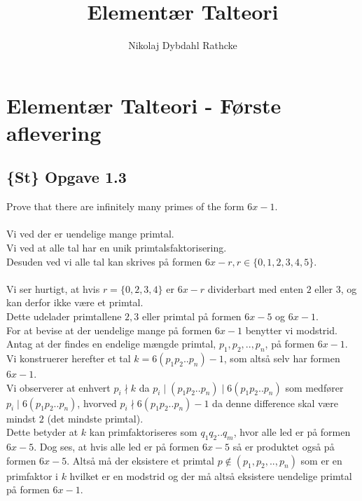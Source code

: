 \documentclass[12pt]{article}
\title{Elementær Talteori}
\author{Nikolaj Dybdahl Rathcke}
\begin{document}
\section*{Elementær Talteori - Første aflevering}

\subsection*{\{\textbf{St}\} Opgave 1.3}
Prove that there are infinitely many primes of the form $6x-1$.\\
\\
Vi ved der er uendelige mange primtal.\\
Vi ved at alle tal har en unik primtalsfaktorisering.\\
Desuden ved vi alle tal kan skrives på formen $6x-r, r\in \{0,1,2,3,4,5\}$.\\
\\
Vi ser hurtigt, at hvis $r=\{0,2,3,4\}$ er $6x-r$ dividerbart med enten $2$ eller $3$, og kan derfor ikke være et primtal.\\
Dette udelader primtallene $2,3$ eller primtal på formen $6x-5$ og $6x-1$.\\
For at bevise at der uendelige mange på formen $6x-1$ benytter vi modstrid. Antag at der findes en endelige mængde primtal, $p_1,p_2, .., p_n$, på formen $6x-1$. Vi konstruerer herefter et tal $k=6(p_1p_2..p_n)-1$, som altså selv har formen $6x-1$.\\
Vi observerer at enhvert $p_i \nmid k$ da $p_i\mid (p_1p_2..p_n)\mid 6(p_1p_2..p_n) $ som medfører $p_i\mid 6(p_1p_2..p_n)$, hvorved $p_i\nmid 6(p_1p_2..p_n)-1$ da denne difference skal være mindst $2$ (det mindste primtal). \\
Dette betyder at $k$ kan primfaktoriseres som $q_1q_2..q_m$, hvor alle led er på formen $6x-5$. Dog ses, at hvis alle led er på formen $6x-5$ så er produktet også på formen $6x-5$. Altså må der eksistere et primtal $p\notin (p_1,p_2,..,p_n)$ som er en primfaktor i $k$ hvilket er en modstrid og der må altså eksistere uendelige primtal på formen $6x-1$.
\end{document}
